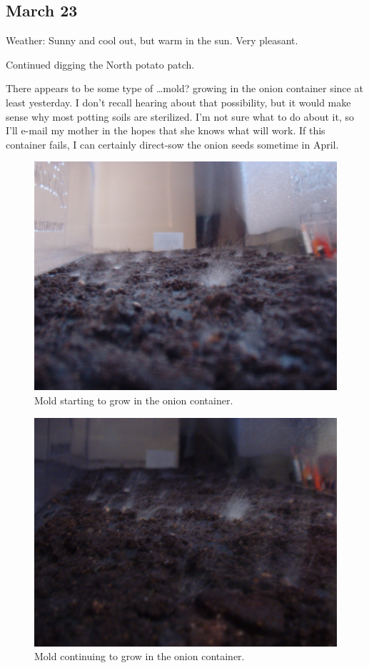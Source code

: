 \documentclass{article}
\begin{document}
\subsection*{March 23}
Weather: Sunny and cool out, but warm in the sun. Very pleasant.

Continued digging the North potato patch.

There appears to be some type of \ldots mold? growing in the onion container since at least yesterday. I don't recall hearing about that possibility, but it would make sense why most potting soils are sterilized. I'm not sure what to do about it, so I'll e-mail my mother in the hopes that she knows what will work. If this container fails, I can certainly direct-sow the onion seeds sometime in April.
\begin{figure}
\protect \includegraphics[scale=0.20]{pics/0323_mold1.jpg}
\caption{Mold starting to grow in the onion container.}
\end{figure}
\begin{figure}
\protect \includegraphics[scale=0.20]{pics/0323_mold2.jpg}
\caption{Mold continuing to grow in the onion container.}
\end{figure}
\end{document}
